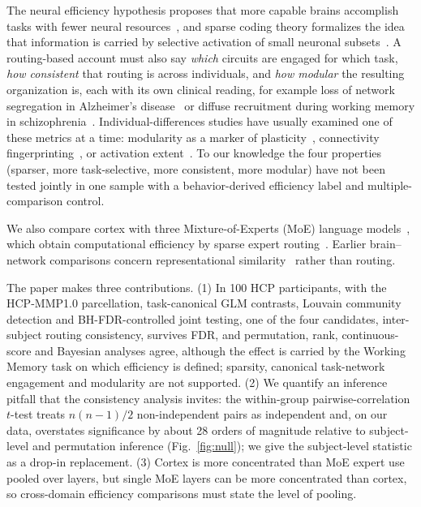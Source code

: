 \documentclass[conference]{IEEEtran}
\begin{document}
The neural efficiency hypothesis proposes that more capable brains accomplish tasks with fewer neural resources~\cite{haier1988cortical,neubauer2009intelligence}, and sparse coding theory formalizes the idea that information is carried by selective activation of small neuronal subsets~\cite{olshausen1996emergence,olshausen2004sparse}. A routing-based account must also say \emph{which} circuits are engaged for which task, \emph{how consistent} that routing is across individuals, and \emph{how modular} the resulting organization is, each with its own clinical reading, for example loss of network segregation in Alzheimer's disease~\cite{zhang2023dissociable,ewers2021segregation} or diffuse recruitment during working memory in schizophrenia~\cite{kim2010working}. Individual-differences studies have usually examined one of these metrics at a time: modularity as a marker of plasticity~\cite{gallen2019brain,arnemann2015functional}, connectivity fingerprinting~\cite{finn2015functional,shen2017using}, or activation extent~\cite{haier1988cortical}. To our knowledge the four properties (sparser, more task-selective, more consistent, more modular) have not been tested jointly in one sample with a behavior-derived efficiency label and multiple-comparison control.

We also compare cortex with three Mixture-of-Experts (MoE) language models~\cite{shazeer2017outrageously,fedus2022switch}, which obtain computational efficiency by sparse expert routing~\cite{bommasani2021opportunities}. Earlier brain--network comparisons concern representational similarity~\cite{yamins2016using,kriegeskorte2015deep,schrimpf2021neural} rather than routing.

The paper makes three contributions. (1) In 100 HCP participants, with the HCP-MMP1.0 parcellation, task-canonical GLM contrasts, Louvain community detection and BH-FDR-controlled joint testing, one of the four candidates, inter-subject routing consistency, survives FDR, and permutation, rank, continuous-score and Bayesian analyses agree, although the effect is carried by the Working Memory task on which efficiency is defined; sparsity, canonical task-network engagement and modularity are not supported. (2) We quantify an inference pitfall that the consistency analysis invites: the within-group pairwise-correlation $t$-test treats $n(n-1)/2$ non-independent pairs as independent and, on our data, overstates significance by about 28 orders of magnitude relative to subject-level and permutation inference (Fig.~\ref{fig:null}); we give the subject-level statistic as a drop-in replacement. (3) Cortex is more concentrated than MoE expert use pooled over layers, but single MoE layers can be more concentrated than cortex, so cross-domain efficiency comparisons must state the level of pooling.
\end{document}
